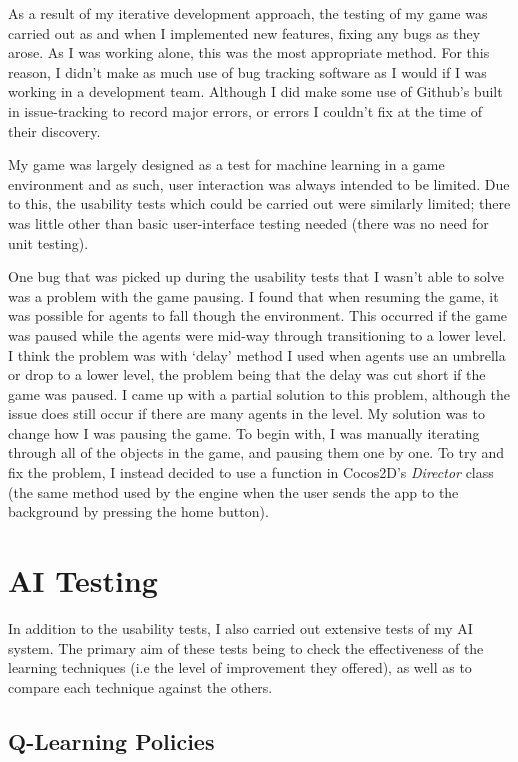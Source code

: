 \documentclass[a4paper,oneside]{report}
\begin{document}
As a result of my iterative development approach, the testing of my game was carried out as and when I implemented new features, fixing any bugs as they arose. As I was working alone, this was the most appropriate method. For this reason, I didn't make as much use of bug tracking software as I would if I was working in a development team. Although I did make some use of Github's built in issue-tracking to record major errors, or errors I couldn't fix at the time of their discovery.

My game was largely designed as a test for machine learning in a game environment and as such, user interaction was always intended to be limited. Due to this, the usability tests which could be carried out were similarly limited; there was little other than basic user-interface testing needed (there was no need for unit testing).

One bug that was picked up during the usability tests that I wasn't able to solve was a problem with the game pausing. I found that when resuming the game, it was possible for agents to fall though the environment. This occurred if the game was paused while the agents were mid-way through transitioning to a lower level. I think the problem was with `delay' method I used when agents use an umbrella or drop to a lower level, the problem being that the delay was cut short if the game was paused. I came up with a partial solution to this problem, although the issue does still occur if there are many agents in the level. My solution was to change how I was pausing the game. To begin with, I was manually iterating through all of the objects in the game, and pausing them one by one. To try and fix the problem, I instead decided to use a function in Cocos2D's \emph{Director} class (the same method used by the engine when the user sends the app to the background by pressing the home button).

\section{AI Testing}

In addition to the usability tests, I also carried out extensive tests of my AI system. The primary aim of these tests being to check the effectiveness of the learning techniques (i.e the level of improvement they offered), as well as to compare each technique against the others.

\subsection{Q-Learning Policies}
\end{document}
